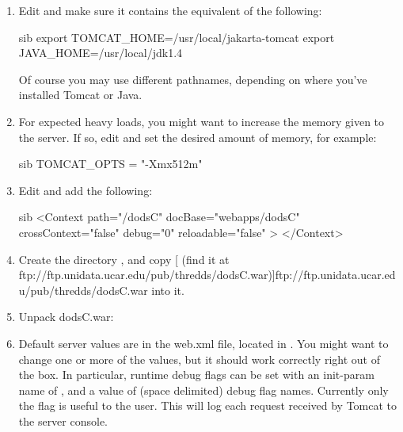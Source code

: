 \documentclass{dods-book}
\begin{document}
\begin{enumerate}
\item Edit  and make sure it
  contains the equivalent of the following:

\begin{vcode}{sib}
export TOMCAT_HOME=/usr/local/jakarta-tomcat
export JAVA_HOME=/usr/local/jdk1.4
\end{vcode}

Of course you may use different pathnames, depending on where you've
installed Tomcat or Java.

\item For expected heavy loads, you might want to increase the memory
  given to the server. If so, edit 
  and set the desired amount of memory, for example:

\begin{vcode}{sib}
TOMCAT_OPTS = "-Xmx512m"
\end{vcode}

\item Edit  and add the following:

\begin{vcode}{sib}
<Context path="/dodsC"
         docBase="webapps/dodsC"
         crossContext="false"
         debug="0"
         reloadable="false" >
</Context>
\end{vcode}


\item Create the directory , and copy
[ (find it at ftp://ftp.unidata.ucar.edu/pub/thredds/dodsC.war)]{ftp://ftp.unidata.ucar.edu/pub/thredds/dodsC.war}
into it. 

\item Unpack dodsC.war:


\item Default server values are in the web.xml file, located in 
  . You might want
  to change one or more of the  values, but it should
  work correctly right out of the box. In particular, runtime debug
  flags can be set with an init-param name of , and a
  value of (space delimited) debug flag names. Currently only the
   flag is useful to the user. This will log each
  request received by Tomcat to the server console.


\end{enumerate}
\end{document}
